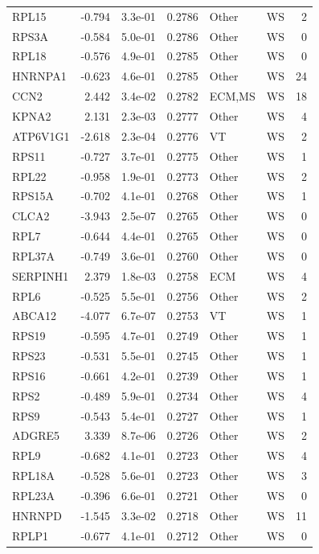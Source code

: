 \begin{table}[ht]
\begin{tabular}{lrlrllr}
  RPL15 & -0.794 & 3.3e-01 & 0.2786 & Other & WS & 2 \\ 
  RPS3A & -0.584 & 5.0e-01 & 0.2786 & Other & WS & 0 \\ 
  RPL18 & -0.576 & 4.9e-01 & 0.2785 & Other & WS & 0 \\ 
  HNRNPA1 & -0.623 & 4.6e-01 & 0.2785 & Other & WS & 24 \\ 
  CCN2 & 2.442 & 3.4e-02 & 0.2782 & ECM,MS & WS & 18 \\ 
  KPNA2 & 2.131 & 2.3e-03 & 0.2777 & Other & WS & 4 \\ 
  ATP6V1G1 & -2.618 & 2.3e-04 & 0.2776 & VT & WS & 2 \\ 
  RPS11 & -0.727 & 3.7e-01 & 0.2775 & Other & WS & 1 \\ 
  RPL22 & -0.958 & 1.9e-01 & 0.2773 & Other & WS & 2 \\ 
  RPS15A & -0.702 & 4.1e-01 & 0.2768 & Other & WS & 1 \\ 
  CLCA2 & -3.943 & 2.5e-07 & 0.2765 & Other & WS & 0 \\ 
  RPL7 & -0.644 & 4.4e-01 & 0.2765 & Other & WS & 0 \\ 
  RPL37A & -0.749 & 3.6e-01 & 0.2760 & Other & WS & 0 \\ 
  SERPINH1 & 2.379 & 1.8e-03 & 0.2758 & ECM & WS & 4 \\ 
  RPL6 & -0.525 & 5.5e-01 & 0.2756 & Other & WS & 2 \\ 
  ABCA12 & -4.077 & 6.7e-07 & 0.2753 & VT & WS & 1 \\ 
  RPS19 & -0.595 & 4.7e-01 & 0.2749 & Other & WS & 1 \\ 
  RPS23 & -0.531 & 5.5e-01 & 0.2745 & Other & WS & 1 \\ 
  RPS16 & -0.661 & 4.2e-01 & 0.2739 & Other & WS & 1 \\ 
  RPS2 & -0.489 & 5.9e-01 & 0.2734 & Other & WS & 4 \\ 
  RPS9 & -0.543 & 5.4e-01 & 0.2727 & Other & WS & 1 \\ 
  ADGRE5 & 3.339 & 8.7e-06 & 0.2726 & Other & WS & 2 \\ 
  RPL9 & -0.682 & 4.1e-01 & 0.2723 & Other & WS & 4 \\ 
  RPL18A & -0.528 & 5.6e-01 & 0.2723 & Other & WS & 3 \\ 
  RPL23A & -0.396 & 6.6e-01 & 0.2721 & Other & WS & 0 \\ 
  HNRNPD & -1.545 & 3.3e-02 & 0.2718 & Other & WS & 11 \\ 
  RPLP1 & -0.677 & 4.1e-01 & 0.2712 & Other & WS & 0 \\ 

\end{tabular}
\end{table}
